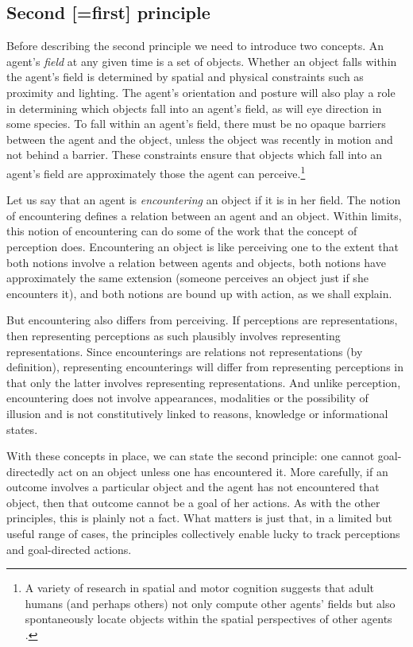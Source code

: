 \documentclass[12pt,\papersize]{extarticle}
\begin{document}
\subsection{Second [=first] principle}
Before describing the second principle we need to introduce two concepts.
An agent’s \textit{field} at any given time is a set of objects.  Whether an object falls within the agent’s field is determined by spatial and physical constraints such as proximity and lighting.  The agent’s orientation and posture will also play a role in determining which objects fall into an agent’s field, as will eye direction in some species.  To fall within an agent’s field, there must be no opaque barriers between the agent and the object, unless the object was recently in motion and not behind a barrier.  These constraints ensure that objects which fall into an agent’s field are approximately those the agent can perceive.\footnote{ 	A variety of research in spatial and motor cognition suggests that adult humans (and perhaps others) not only compute other agents’ fields but also spontaneously locate objects within the spatial perspectives of other agents \citep[e.g.][]{en_1700, en_1701}.  }

Let us say that an agent is \textit{encountering} an object if it is in her field.  The notion of encountering defines a relation between an agent and an object.  Within limits, this notion of encountering can do some of the work that the concept of perception does.  Encountering an object is like perceiving one to the extent that both notions involve a relation between agents and objects, both notions have approximately the same extension (someone perceives an object just if she encounters it), and both notions are bound up with action, as we shall explain.  

But encountering also differs from perceiving.
If perceptions are representations, then representing perceptions as such plausibly involves representing representations.
Since encounterings are relations not representations (by definition), representing encounterings will  differ from representing perceptions in that only the latter involves representing representations.
And unlike perception, encountering does not involve 
appearances, modalities or the possibility of illusion 
and is not constitutively linked to reasons, knowledge or informational states.

With these concepts in place, we can state the second principle: 
one cannot goal-directedly act on an object unless one has encountered it.  
More carefully,
if an outcome involves a particular object
and the agent has not encountered that object,
then that outcome cannot be a goal of her actions.
As with the other principles, this is plainly not a fact.
What matters is just that, in a limited but useful range of cases, the principles collectively enable lucky to track perceptions and goal-directed actions.
\end{document}
